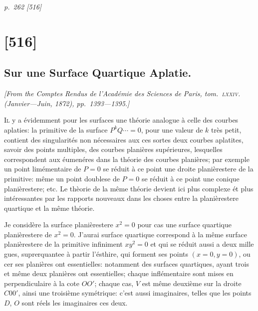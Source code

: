\documentclass[11pt,a4paper]{article}
\theoremstyle{plain}
\theoremstyle{definition}
\begin{document}
\clearpage

\bigskip
\textit{p.~262 [516]}
\smallskip

\section{[516]}
\subsection{Sur une Surface Quartique Aplatie.}

\begin{center}
\textit{[From the \textit{Comptes Rendus de l'Acad\'emie des Sciences de Paris}, tom.~\textsc{lxxiv}. (Janvier---Juin, 1872), pp.~1393---1395.]}
\end{center}

\textsc{Il} y a \'evidemment pour les surfaces une th\'eorie analogue \`a celle des courbes
aplaties: la primitive de la surface $P^kQ \cdots = 0$, pour une valeur de $k$ tr\`es petit,
contient des singularit\'es non n\'ecessaires aux ces sortes deux courbes aplatites, savoir des
points multiples, des courbes plani\`eres sup\'erieures, lesquelles correspondent aux \'eumen\'eres dans
la th\'eorie des courbes plani\`eres; par exemple un point lim\'ementaire de $P = 0$ se r\'eduit \`a
ce point une droite plani\`erestere de la primitive: m\^eme un point doublese de $P = 0$ se
r\'eduit \`a ce point une conique plani\`erestere; etc. Le th\`eorie de la m\^eme th\'eorie devient ici
plus complexe \'et plus int\'eressantes par les rapports nouveaux dans les choses entre la
plani\`erestere quartique et la m\^eme th\'eorie.

Je consid\`ere la surface plani\`erestere $x^2 = 0$ pour cas une surface quartique plani\`erestere de $x^2 = 0$.
J'aurai surface quartique correspond \`a la m\^eme surface plani\`erestere de la primitive infiniment $xy^2 = 0$ et qui se r\'eduit aussi a deux mille gues, suprerquantee
\`a partir l'\'esthire, qui forment ses points $(x = 0, y = 0)$, ou cer ses
plani\`eres ont essentielles: notamment des surfaces quartiques, ayant trois et m\^eme deux
plani\`eres ont essentielles; chaque infl\'ementaire sont mises en perpendiculaire \`a la cote $OO'$;
chaque cas, $V$ est m\^eme deuxi\`eme sur la droite $C00'$, ainsi une troisi\`eme sym\'etrique:
c'est aussi imaginaires, telles que les points $D$, $O$ sont r\'eels les imaginaires ces deux.
\end{document}
